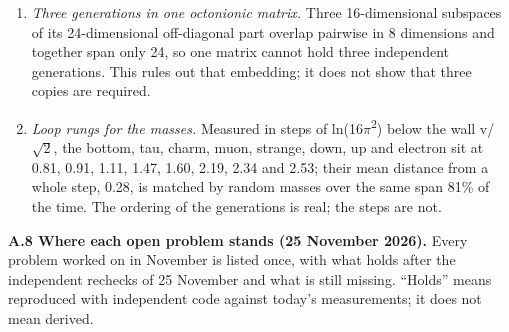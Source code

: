 \documentclass[
  11pt,
]{article}
\begin{document}
\begin{enumerate}
\item
  \emph{Three generations in one octonionic matrix.} Three 16-dimensional subspaces of its 24-dimensional off-diagonal part overlap pairwise in 8 dimensions and together span only 24, so one matrix cannot hold three independent generations. This rules out that embedding; it does not show that three copies are required.
\item
  \emph{Loop rungs for the masses.} Measured in steps of ln(16\ensuremath{\pi}\textsuperscript{2}) below the wall v/\ensuremath{\sqrt{2}}, the bottom, tau, charm, muon, strange, down, up and electron sit at 0.81, 0.91, 1.11, 1.47, 1.60, 2.19, 2.34 and 2.53; their mean distance from a whole step, 0.28, is matched by random masses over the same span 81\% of the time. The ordering of the generations is real; the steps are not.
\end{enumerate}

\textbf{A.8 Where each open problem stands (25 November 2026).} Every problem worked on in November is listed once, with what holds after the independent rechecks of 25 November and what is still missing. ``Holds'' means reproduced with independent code against today's measurements; it does not mean derived.
\end{document}

